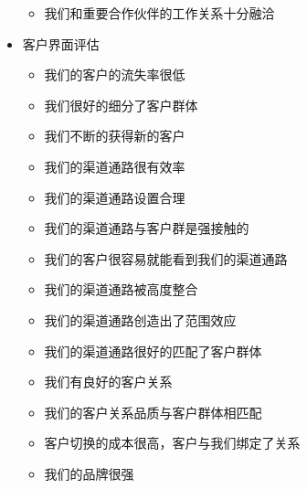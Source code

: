 \begin{multicols}{2}
\begin{itemize}
\begin{itemize}
        \item 我们和重要合作伙伴的工作关系十分融洽
    \end{itemize}
    \item 客户界面评估
    \begin{itemize}
        \item 我们的客户的流失率很低
        \item 我们很好的细分了客户群体
        \item 我们不断的获得新的客户
        \item 我们的渠道通路很有效率
        \item 我们的渠道通路设置合理
        \item 我们的渠道通路与客户群是强接触的
        \item 我们的客户很容易就能看到我们的渠道通路
        \item 我们的渠道通路被高度整合
        \item 我们的渠道通路创造出了范围效应
        \item 我们的渠道通路很好的匹配了客户群体
        \item 我们有良好的客户关系
        \item 我们的客户关系品质与客户群体相匹配
        \item 客户切换的成本很高，客户与我们绑定了关系
        \item 我们的品牌很强
    \end{itemize}
\end{itemize}
\end{multicols}


